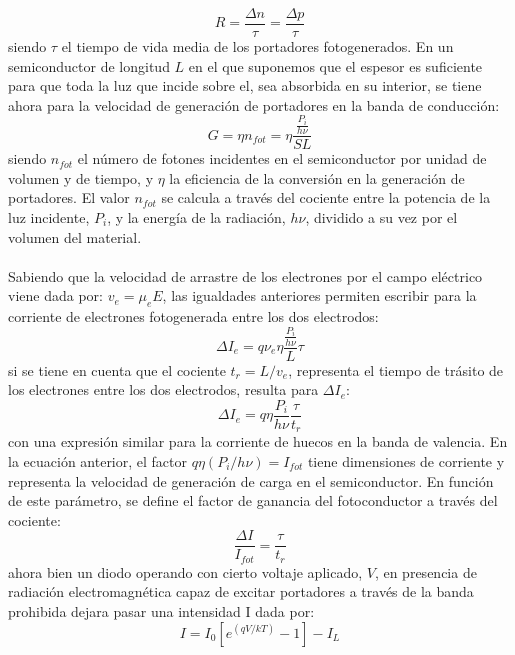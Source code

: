 \documentclass[12]{article}
\begin{document}
\begin{multicols}{2}
\begin{equation}
R = \frac{\Delta n }{\tau} = \frac{\Delta p}{\tau}
\end{equation}
siendo $\tau$ el tiempo de vida media de los portadores fotogenerados. En un semiconductor de longitud $L$ en el que suponemos que el espesor es suficiente para que toda la luz que incide sobre el, sea absorbida en su interior, se tiene ahora para la velocidad de generación de portadores en la banda de conducción:
\begin{equation}
G = \eta n_{fot} = \eta \frac{\frac{P_{i}}{h\nu}}{SL}
\end{equation}
siendo $n_{fot}$ el número de fotones incidentes en el semiconductor por unidad de volumen y de tiempo, y $\eta$ la eficiencia de la conversión en la generación de portadores. El valor $n_{fot}$ se calcula a través del cociente entre la potencia de la luz incidente, $P_{i}$, y la energía de la radiación, $h\nu$, dividido a su vez por el volumen del material.\\ \\
Sabiendo que la velocidad de arrastre de los electrones por el campo eléctrico viene dada por: $v_{e} = \mu_{e}E$, las igualdades anteriores permiten escribir para la corriente de electrones fotogenerada entre los dos electrodos:
\begin{equation}
\Delta I_{e} = q\nu_{e}\eta\frac{\frac{P_{i}}{h\nu}}{L}\tau
\end{equation}
si se tiene en cuenta que el cociente $t_{r} = L/v_{e}$, representa el tiempo de trásito de los electrones entre los dos electrodos, resulta para $\Delta I_{e}$:
\begin{equation}
\Delta I_{e} = q\eta \frac{P_{i}}{h\nu}\frac{\tau}{t_{r}}
\end{equation}
con una expresión similar para la corriente de huecos en la banda de valencia. En la ecuación anterior, el factor $q\eta(P_{i}/h\nu) = I_{fot}$ tiene dimensiones de corriente y representa la velocidad de generación de carga en el semiconductor. En función de este parámetro, se define el factor de ganancia del fotoconductor a través del cociente:
\begin{equation}
\frac{\Delta I}{I_{fot}} = \frac{\tau}{t_{r}}
\end{equation}
ahora bien un diodo operando con cierto voltaje aplicado, $V$, en presencia de radiación electromagnética  capaz de excitar portadores a través de la banda prohibida dejara pasar una intensidad I dada por:
\begin{equation}
I = I_{0}[e^{(qV/kT)}-1] - I_{L}

\end{equation}
\end{multicols}
\end{document}

